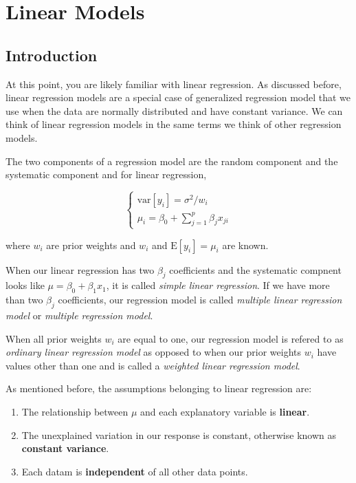 \documentclass[
]{book}
\providecommand{\tightlist}{%
  \setlength{\itemsep}{0pt}\setlength{\parskip}{0pt}}
\begin{document}
\hypertarget{linear}{%
\chapter{Linear Models}\label{linear}}

\hypertarget{introduction}{%
\section{Introduction}\label{introduction}}

At this point, you are likely familiar with linear regression. As discussed before, linear regression models are a special case of generalized regression model that we use when the data are normally distributed and have constant variance. We can think of linear regression models in the same terms we think of other regression models.

The two components of a regression model are the random component and the systematic component and for linear regression,

\[
\begin{cases}
  \text{var}[y_i] = \sigma^2/w_i \\
  \mu_i = \beta_0 + \sum_{j=1}^{p}\beta_jx_{ji}
\end{cases}
\]

where \(w_i\) are prior weights and \(w_i\) and \(\text{E}[y_i] = \mu_i\) are known.

When our linear regression has two \(\beta_j\) coefficients and the systematic compnent looks like \(\mu = \beta_0 + \beta_1x_1\), it is called \emph{simple linear regression}. If we have more than two \(\beta_j\) coefficients, our regression model is called \emph{multiple linear regression model} or \emph{multiple regression model}.

When all prior weights \(w_i\) are equal to one, our regression model is refered to as \emph{ordinary linear regression model} as opposed to when our prior weights \(w_i\) have values other than one and is called a \emph{weighted linear regression model}.

As mentioned before, the assumptions belonging to linear regression are:

\begin{enumerate}
\def\labelenumi{\arabic{enumi}.}
\tightlist
\item
  The relationship between \(\mu\) and each explanatory variable is \textbf{linear}.
\item
  The unexplained variation in our response is constant, otherwise known as \textbf{constant variance}.
\item
  Each datam is \textbf{independent} of all other data points.
\end{enumerate}
\end{document}
